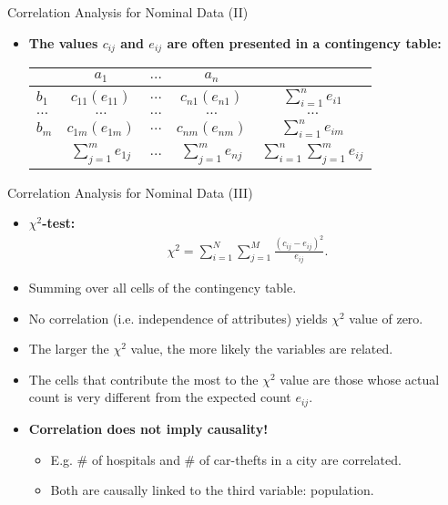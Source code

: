 \begin{frame}{Correlation Analysis for Nominal Data (II)}
	\begin{itemize}
		\item \textbf{The values $c_{ij}$ and $e_{ij}$ are often presented in a
			      \color{airforceblue}contingency table:} \\
		      \centering
		      \vspace{5mm}
		      \begin{tabular}{l|c|c|c|c|}
			               & $a_1$                             & $\ldots$ & $a_n$             &
			      \\\hline
			      $b_1$    & $c_{11} (e_{11})$                 & $\ldots$ & $c_{n1} (e_{n1})$ &
			      $\sum_{i=1}^n e_{i1}$
			      \\\hline
			      $\ldots$ & $\ldots$                          & $\ldots$ & $\ldots$          & $\ldots$
			      \\\hline
			      $b_m$    & $c_{1m} (e_{1m})$                 & $\ldots$ & $c_{nm} (e_{nm})$ &
			      $\sum_{i=1}^n e_{im}$
			      \\\hline
			               & $\sum_{j=1}^m e_{1j}$             & $\ldots$ & $\sum_{j=1}^m
			      e_{nj}$  & $\sum_{i=1}^n\sum_{j=1}^m e_{ij}$
			      \\\hline
		      \end{tabular}
	\end{itemize}
\end{frame}

\begin{frame}{Correlation Analysis for Nominal Data (III)}
	\begin{itemize}
		\item \textbf{\color{airforceblue}$\chi^2$-test:}
		      \begin{align}
			      \chi^2 = \sum_{i=1}^{N}\sum_{j=1}^{M}
			      \frac{(c_{ij}-e_{ij})^2}{e_{ij}}.
		      \end{align}
		\item Summing over all cells of the contingency table.
		\item No correlation (i.e. independence of attributes) yields $\chi^2$
		      value of zero.
		\item The larger the $\chi^2$ value, the more likely the variables are
		      related.
		\item The cells that contribute the most to the $\chi^2$ value
		      are those whose actual count is very different from the expected count
		      $e_{ij}$.
	\end{itemize}
	\begin{itemize}
		\item \textbf{Correlation does not imply causality!}
		      \begin{itemize}
			      \item E.g. $\#$ of hospitals and $\#$ of car-thefts in a city are
			            correlated.
			      \item Both are causally linked to the third variable: population.
		      \end{itemize}
	\end{itemize}
\end{frame}

